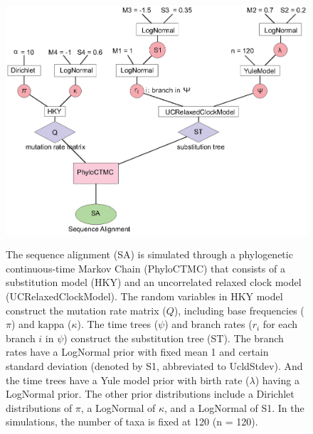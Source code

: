 \documentclass{bmcart}
\begin{document}
\begin{backmatter}
\begin{figure}[h!]
\includegraphics[width=12cm]{Fig11-modelvalidation.eps}\\
\caption{
             The sequence alignment (SA) is simulated through a phylogenetic continuous-time Markov Chain (PhyloCTMC) that consists of a substitution model (HKY) and an uncorrelated relaxed clock model (UCRelaxedClockModel). The random variables in HKY model construct the mutation rate matrix ($Q$), including base frequencies ($\pi$) and kappa ($\kappa$). The time trees ($\psi$) and branch rates ($r_i$ for each branch $i$ in $\psi$) construct the substitution tree (ST). The branch rates have a LogNormal prior with fixed mean 1 and certain standard deviation (denoted by S1, abbreviated to UcldStdev). And the time trees have a Yule model prior with birth rate ($\lambda$) having a LogNormal prior. The other prior distributions include a Dirichlet distributions of $\pi$, a LogNormal of $\kappa$, and a LogNormal of S1. In the simulations, the number of taxa is fixed at 120 (n = 120).}
\label{modelvalidation}
\end{figure}


\end{backmatter}
\end{document}
